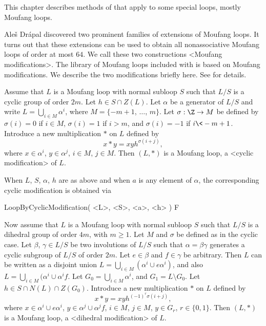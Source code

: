 
This chapter describes methods of {\LOOPS} that apply to some
special loops, mostly Moufang loops.


Ale\v{s} Dr\'apal discovered two prominent families of extensions of Moufang
loops. It turns out that these extensions can be used to obtain all
nonassociative Moufang loops of order at most $64$. We call these two
constructions <Moufang modifications>. The library
of Moufang loops included with {\LOOPS} is based on Moufang modifications. We
describe the two modifications briefly here. See \cite{DrVo} for details.

Assume that $L$ is a Moufang loop with normal subloop $S$ such that $L/S$ is a
cyclic group of order $2m$. Let $h\in S\cap Z(L)$. Let $\alpha$ be a generator
of $L/S$ and write $L = \bigcup_{i\in M} \alpha^i$, where $M=\{-m+1$, $\dots$,
$m\}$. Let $\sigma:\Z\to M$ be defined by $\sigma(i)=0$ if $i\in M$,
$\sigma(i)=1$ if $i>m$, and $\sigma(i)=-1$ if $i\<-m+1$. Introduce a new
multiplication $\ast$ on $L$ defined by
$$
    x\ast y = xyh^{\sigma(i+j)},
$$
where $x\in \alpha^i$, $y\in\alpha^j$, $i\in M$, $j\in M$. Then $(L,\ast)$ is a
Moufang loop, a <cyclic modification> of $L$.

When $L$, $S$, $\alpha$, $h$ are as above and when $a$ is any element of
$\alpha$, the corresponding cyclic modification is obtained via

\>LoopByCyclicModification( <L>, <S>, <a>, <h> ) F

Now assume that $L$ is a Moufang loop with normal subloop $S$ such that $L/S$
is a dihedral group of order $4m$, with $m\ge 1$. Let $M$ and $\sigma$ be
defined as in the cyclic case. Let $\beta$, $\gamma\in L/S$ be two involutions
of $L/S$ such that $\alpha=\beta\gamma$ generates a cyclic subgroup of $L/S$ of
order $2m$. Let $e\in\beta$ and $f\in\gamma$ be arbitrary. Then $L$ can be
written as a disjoint union $L=\bigcup_{i\in M}(\alpha^i\cup e\alpha^i)$, and
also $L=\bigcup_{i\in M}(\alpha^i\cup \alpha^if$. Let $G_0=\bigcup_{i\in
M}\alpha^i$, and $G_1=L\setminus G_0$. Let $h\in S\cap N(L)\cap Z(G_0)$.
Introduce a new multiplication $\ast$ on $L$ defined by
$$
    x\ast y = xyh^{(-1)^r\sigma(i+j)},
$$
where $x\in\alpha^i\cup e\alpha^i$, $y\in\alpha^j\cup \alpha^jf$, $i\in M$,
$j\in M$, $y\in G_r$, $r\in\{0,1\}$. Then $(L,\ast)$ is a Moufang loop, a
<dihedral modification> of $L$.

